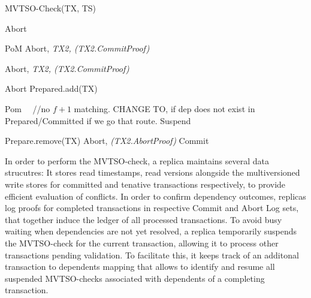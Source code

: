 \begin{algorithm}
\caption{MVTSO-Check(TX, TS)}\label{mvtso}
\begin{algorithmic}[1]
\State \Return Abort
\EndIf

	 \Return PoM
	\EndIf
          \State  \Return Abort, \textit{TX2, (TX2.CommitProof)}  
         \EndIf  
\EndFor

          \State  \Return Abort, \textit{TX2, (TX2.CommitProof)}
         
        \EndIf
          \State  \Return Abort
       \EndIf
\EndFor
\State Prepared.add(TX) 

 \Return Pom ~~//no $f+1$ matching. CHANGE TO, if dep does not exist in Prepared/Committed if we go that route.
\EndIf
{}
\State Suspend
\EndWhile

		\State	Prepare.remove(TX)
		\State \Return Abort, \textit{(TX2.AbortProof)}
		\EndIf
\EndFor
\State \Return Commit
\end{algorithmic}

\end{algorithm}

In order to perform the MVTSO-check, a replica maintains several data strucutres: \one It stores read timestamps, read versions alongside the multiversioned write stores for committed and tenative transactions respectively, to provide efficient evaluation of conflicts.
\two In order to confirm dependency outcomes, replicas log proofs for completed transactions in respective Commit and Abort Log sets, that together induce the ledger of all processed transactions. 
\three To avoid busy waiting when dependencies are not yet resolved, a replica temporarily suspends the MVTSO-check for the current transaction, allowing it to process other transactions pending validation. To facilitate this, it keeps track of an additonal transaction to dependents mapping that allows to identify and resume all suspended MVTSO-checks associated with dependents of a completing transaction.

